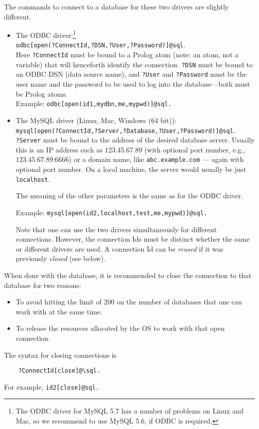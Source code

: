 The commands to connect to a database for these two drivers are slightly
different.
\begin{itemize}
\item The ODBC driver:\footnote{
    The ODBC driver for MySQL 5.7 has a number of problems on Linux and
    Mac, so we recommend to use MySQL 5.6, if ODBC is required.
    }
  \\
  \texttt{odbc[open(?ConnectId,?DSN,?User,?Password)]@\bs{}sql}.
  \\
  Here \texttt{?ConnectId} must be bound to a Prolog atom (note: an atom,
  not a variable) that will henceforth identify the connection.
  \texttt{?DSN} must be bound to an ODBC DSN (data source name), and
  \texttt{?User} and \texttt{?Password} must be the user name and the
  password to be used to log into the database---both must be Prolog atoms.   
  \\
  Example:
  \texttt{odbc[open(id1,mydbn,me,mypwd)]@\bs{}sql.}
\item The MySQL driver (Linux, Mac, Windows (64 bit)):\\
  \texttt{mysql[open(?ConnectId,?Server,?Database,?User,?Password)]@\bs{}sql}.
  \\
  \texttt{?Server} must be bound to the address of the desired database server.
  Usually this is an IP address such as 123.45.67.89 (with optional
  port number, e.g., 123.45.67.89:6666) or a domain name, like
  \texttt{abc.example.com} --- again with optional port number. On a local
  machine, the server would usually be just \texttt{localhost}.
  
  The meaning of the other parameters is the same as for the ODBC driver.

  Example: \texttt{mysql[open(id2,localhost,test,me,mypwd)]@\bs{}sql.}  

  Note that one can use the two drivers simultaneously for different
  connections. However, the connection Ids must be distinct whether the
  same or different drivers are used. A connection Id can be \emph{reused}
  if it was previously \emph{closed} (see below).  
\end{itemize}
When done with the database, it is recommended to close the connection to
that database for two
reasons:
\begin{itemize}
\item To avoid hitting the limit of 200 on the number of databases that one
  can work with at the same time.
\item  To release the resources allocated by the OS to work with that open
  connection.
\end{itemize}
The syntax for closing connections is
\begin{verbatim}
    ?ConnectId[close]@\sql.
\end{verbatim}
For example,  \texttt{id2[close]@\bs{}sql.}  

